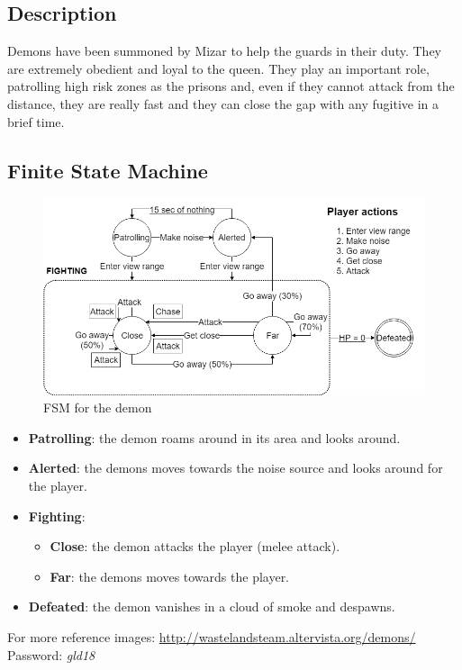 \subsection{Description}
Demons have been summoned by Mizar to help the guards in their duty. They are extremely obedient and loyal to the queen. They play an important role, patrolling high risk zones as the prisons and, even if they cannot attack from the distance, they are really fast and they can close the gap with any fugitive in a brief time.

\subsection{Finite State Machine}
\begin{figure}[H]
  \centering
  \includegraphics[width=\textwidth]{Images/Diagrams/FSMs/demonFSM}
  \caption{FSM for the demon}
\end{figure}

\begin{itemize}
	\item \textbf{Patrolling}: the demon roams around in its area and looks around.
	\item \textbf{Alerted}: the demons moves towards the noise source and looks around for the player.
	\item \textbf{Fighting}:
	\begin{itemize}
		\item \textbf{Close}: the demon attacks the player (melee attack).
		\item \textbf{Far}: the demons moves towards the player.
	\end{itemize}
	\item \textbf{Defeated}: the demon vanishes in a cloud of smoke and despawns.
\end{itemize}

For more reference images: \url{http://wastelandsteam.altervista.org/demons/}\\
Password: \textit{gld18}
